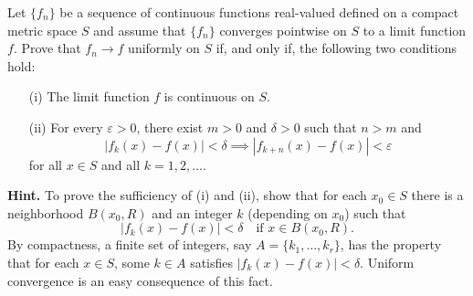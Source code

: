 \begin{problem}[20pts]
    Let $\{f_n\}$ be a sequence of continuous functions real-valued defined on a compact metric space $S$ and assume that $\{f_n\}$ converges pointwise on $S$ to a limit function $f$.  
Prove that $f_n \to f$ uniformly on $S$ if, and only if, the following two conditions hold:

\begin{enumerate}
  \item[(i)] The limit function $f$ is continuous on $S$.
  \item[(ii)] For every $\varepsilon > 0$, there exist $m > 0$ and $\delta > 0$ such that $n > m$ and 
  \[
  |f_k(x) - f(x)| < \delta \implies |f_{k+n}(x) - f(x)| < \varepsilon
  \]
  for all $x \in S$ and all $k = 1, 2, \dots$.
\end{enumerate}

\noindent\textbf{Hint.} To prove the sufficiency of (i) and (ii), show that for each $x_0 \in S$ there is a neighborhood $B(x_0, R)$ and an integer $k$ (depending on $x_0$) such that
\[
|f_k(x) - f(x)| < \delta \quad \text{if } x \in B(x_0,R).
\]
By compactness, a finite set of integers, say $A = \{k_1, \dots, k_r\}$, has the property that for each $x \in S$, some $k \in A$ satisfies $|f_k(x) - f(x)| < \delta$.  
Uniform convergence is an easy consequence of this fact.
\end{problem}

